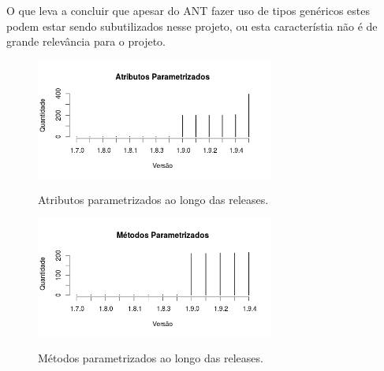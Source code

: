 O que leva a concluir que apesar do ANT fazer uso de tipos genéricos estes podem estar sendo subutilizados nesse projeto, ou esta característia não é de grande relevância para o projeto.\\



	\begin{figure}[h]
		\center
		\includegraphics[width=0.7\textwidth]{Imagens/atributosParametrizados.png}
		\label{fig:atributosParametrizadosAnt}
		\caption{Atributos parametrizados ao longo das releases.}
	\end{figure}
	
	
	\begin{figure}[h]
		\center
		\includegraphics[width=0.7\textwidth]{Imagens/metodosParametrizados.png}
		\label{fig:metodosParametrizadosAnt}
		\caption{Métodos parametrizados ao longo das releases.}
	\end{figure}
